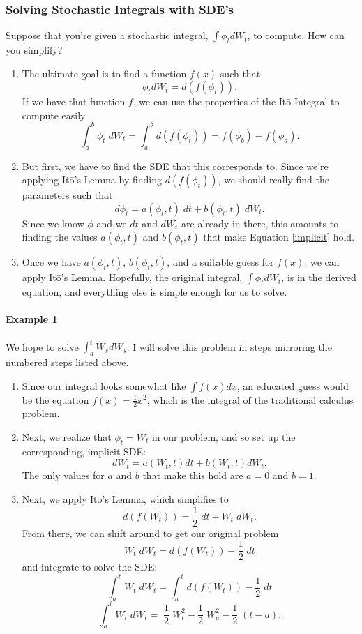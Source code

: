 \documentclass[12pt]{article}
\theoremstyle{plain}
\theoremstyle{definition}
\theoremstyle{remark}
\begin{document}
\subsubsection{Solving Stochastic Integrals with SDE's}

Suppose that you're given a stochastic integral, $\int \phi_t dW_t$,
to compute. How can you simplify?
\begin{enumerate}
   \item{The ultimate goal is to find a function $f(x)$ such that
      \[\phi_t dW_t = d(f(\phi_t)).\]
      If we have that function $f$, we can use the properties of the
      It\={o} Integral to compute easily
      \[ \int^b_a \phi_t\; dW_t =  \int^b_a d(f(\phi_t)) =
	 f(\phi_b) - f(\phi_a).\]
	 }
   \item{But first, we have to find the SDE that this corresponds to.
      Since we're applying It\={o}'s Lemma by finding $d(f(\phi_t))$, we
      should really find the parameters such that
      \begin{equation}
	 \label{implicit}
	 d\phi_t = a(\phi_t, t)\;dt + b(\phi_t, t) \; dW_t.
      \end{equation}
      Since we know $\phi$ and we $dt$ and $dW_t$ are already in there,
      this amounts to finding the values $a(\phi_t, t)$ and $b(\phi_t,t)$
      that make Equation \ref{implicit} hold.
	 }
   \item{Once we have $a(\phi_t, t)$, $b(\phi_t, t)$, and a suitable
      guess for $f(x)$, we can apply It\={o}'s Lemma.  Hopefully,
      the original integral, $\int \phi_t dW_t$, is in the derived
      equation, and everything else is simple enough for us to solve.}
\end{enumerate}


\paragraph{Example 1} We hope to solve $\int^t_a W_s dW_s$. I will
solve this problem in steps mirroring the numbered steps listed above.
\begin{enumerate}
   \item{Since our integral looks somewhat like $\int f(x) dx$, an
      educated guess would be the equation $f(x) = \frac{1}{2} x^2$,
      which is the integral of the traditional calculus problem.
      }
   \item{Next, we realize that $\phi_t = W_t$ in our problem, and
      so set up the corresponding, implicit SDE:
      \[ dW_t = a(W_t, t) dt + b(W_t, t) dW_t.\]
      The only values for $a$ and $b$ that make this hold are $a=0$
      and $b=1$.
      }
   \item{Next, we apply It\={o}'s Lemma, which simplifies to
	 \[d(f(W_t)) = \frac{1}{2}\; dt + W_t \; dW_t. \]
      From there, we can shift around to get our original problem
	 \[W_t \; dW_t= d(f(W_t)) -\frac{1}{2}\; dt \]
      and integrate to solve the SDE:
	 \[ \int^t_a W_t \; dW_t =\int^t_a d(f(W_t))-\frac{1}{2}\;dt\]
	 \[ \int^t_a W_t \; dW_t=\;\frac{1}{2}\;W^2_t-\frac{1}{2}\;W^2_a
	    - \frac{1}{2}\;(t-a).\]
      }
\end{enumerate}
\end{document}
